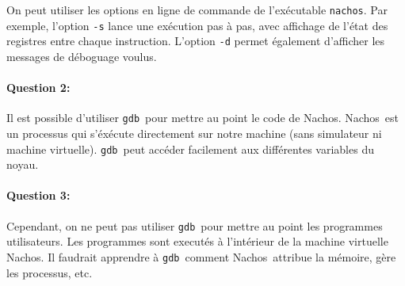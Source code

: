 \documentclass[11pt]{article}
\def\question#1{\paragraph{Question #1:}}
\def\gdb{\texttt{gdb}}
\def\nachos{Nachos}
\begin{document}
On peut utiliser les options en ligne de commande de l'exécutable \texttt{nachos}. Par exemple, l'option \texttt{-s} lance une exécution pas à pas, avec affichage de l'état des registres entre chaque instruction. L'option \texttt{-d} permet également d'afficher les messages de déboguage voulus.


\question{2} Il est possible d'utiliser \gdb\ pour mettre au point le code de \nachos. \nachos\ est un processus qui s'éxécute directement sur notre machine (sans simulateur ni machine virtuelle). \gdb\ peut accéder facilement aux différentes variables du noyau.

\question{3} Cependant, on ne peut pas utiliser \gdb\ pour mettre au point les programmes utilisateurs. Les programmes sont executés à l'intérieur de la machine virtuelle \nachos. Il faudrait apprendre à \gdb\ comment \nachos\ attribue la mémoire, gère les processus, etc.
\end{document}

